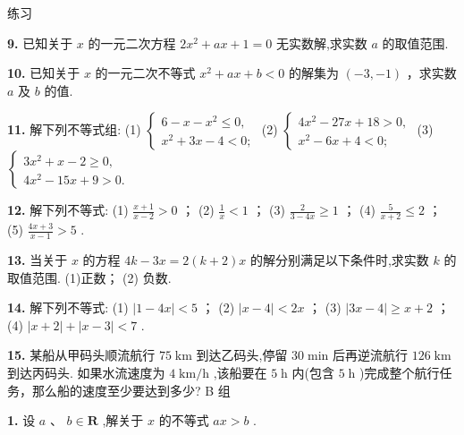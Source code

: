 \documentclass[a4paper,10pt,oneside,fontset=none]{ctexbook}
\renewcommand{\geq}{\geqslant}
\renewcommand{\leq}{\leqslant}
\newenvironment{exercise}[1][]{\begin{exBox}{练习}{#1}}{\end{exBox}}
\numberwithin{equation}{chapter}
\begin{document}
\begin{exercise}
\par\vspace{0.8em}
\textbf{9.} 已知关于 $x$ 的一元二次方程 $2{x}^{2} + {ax} + 1 = 0$ 无实数解,求实数 $a$ 的取值范围.
\par\vspace{0.8em}
\textbf{10.} 已知关于 $x$ 的一元二次不等式 ${x}^{2} + {ax} + b < 0$ 的解集为 $\left( {-3, - 1}\right)$ ，求实数 $a$ 及 $b$ 的值.
\par\vspace{0.8em}
\textbf{11.} 解下列不等式组: (1) $\left\{  \begin{array}{l} 6 - x - {x}^{2} \leq  0, \\  {x}^{2} + {3x} - 4 < 0; \end{array}\right.$ (2) $\left\{  \begin{array}{l} 4{x}^{2} - {27x} + {18} > 0, \\  {x}^{2} - {6x} + 4 < 0; \end{array}\right.$ (3) $\left\{  \begin{array}{l} 3{x}^{2} + x - 2 \geq  0, \\  4{x}^{2} - {15x} + 9 > 0. \end{array}\right.$
\par\vspace{0.8em}
\textbf{12.} 解下列不等式: (1) $\frac{x + 1}{x - 2} > 0$ ； (2) $\frac{1}{x} < 1$ ； (3) $\frac{2}{3 - {4x}} \geq  1$ ； (4) $\frac{5}{x + 2} \leq  2$ ； (5) $\frac{{4x} + 3}{x - 1} > 5$ .
\par\vspace{0.8em}
\textbf{13.} 当关于 $x$ 的方程 ${4k} - {3x} = 2\left( {k + 2}\right) x$ 的解分别满足以下条件时,求实数 $k$ 的取值范围. (1)正数； (2) 负数.
\par\vspace{0.8em}
\textbf{14.} 解下列不等式: (1) $\left| {1 - {4x}}\right|  < 5$ ； (2) $\left| {x - 4}\right|  < {2x}$ ； (3) $\left| {{3x} - 4}\right|  \geq  x + 2$ ； (4) $\left| {x + 2}\right|  + \left| {x - 3}\right|  < 7$ .
\par\vspace{0.8em}
\textbf{15.} 某船从甲码头顺流航行 ${75}\mathrm{\;{km}}$ 到达乙码头,停留 ${30}\mathrm{\;{min}}$ 后再逆流航行 ${126}\mathrm{\;{km}}$ 到达丙码头. 如果水流速度为 $4\mathrm{\;{km}}/\mathrm{h}$ ,该船要在 $5\mathrm{\;h}$ 内(包含 $5\mathrm{\;h}$ )完成整个航行任务，那么船的速度至少要达到多少? B 组
\par\vspace{0.8em}
\textbf{1.} 设 $a\text{ 、 }b \in  \mathbf{R}$ ,解关于 $x$ 的不等式 ${ax} > b$ .

\end{exercise}
\end{document}
